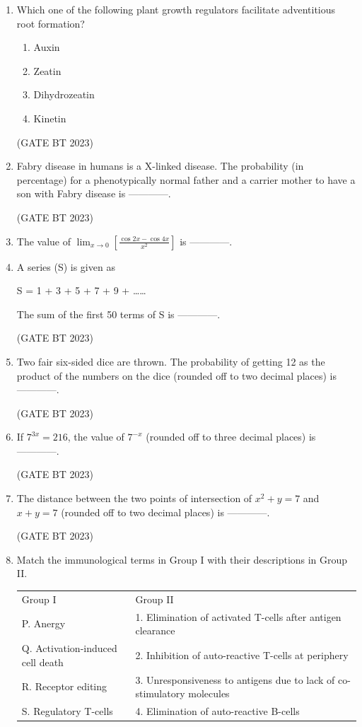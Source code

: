 \documentclass[journal,12pt,onecolumn]{IEEEtran}
\begin{document}
\begin{enumerate}
    \item Which one of the following plant growth regulators facilitate adventitious root formation?
    \begin{enumerate}
        \item Auxin
        \item Zeatin
        \item Dihydrozeatin
        \item Kinetin
    \end{enumerate}
    \hfill(GATE BT 2023)

    \item Fabry disease in humans is a X-linked disease. The probability (in percentage) for a phenotypically normal father and a carrier mother to have a son with Fabry disease is ------------.

\hfill(GATE BT 2023)

    \item The value of $\lim_{x \to 0} \left[ \frac{\cos 2x - \cos 4x}{x^2} \right]$ is ------------.

    \item A series (S) is given as
    
    S = 1 + 3 + 5 + 7 + 9 + ……
    
    The sum of the first 50 terms of S is ------------.

    \hfill(GATE BT 2023)

    \item Two fair six-sided dice are thrown. The probability of getting 12 as the product of the numbers on the dice (rounded off to two decimal places) is ------------.

    \hfill(GATE BT 2023)

    \item If $7^{3x} = 216$, the value of $7^{-x}$ (rounded off to three decimal places) is ------------.

    \hfill(GATE BT 2023)

    \item The distance between the two points of intersection of $x^2 + y = 7$ and $x + y = 7$ (rounded off to two decimal places) is ------------.

    \hfill(GATE BT 2023)

    \item Match the immunological terms in Group I with their descriptions in Group II.
    
    \begin{tabular}{ll}
        Group I & Group II \\
        P. Anergy & 1. Elimination of activated T-cells after antigen clearance \\
        Q. Activation-induced cell death & 2. Inhibition of auto-reactive T-cells at periphery \\
        R. Receptor editing & 3. Unresponsiveness to antigens due to lack of co-stimulatory molecules \\
        S. Regulatory T-cells & 4. Elimination of auto-reactive B-cells \\
    \end{tabular}
    

\end{enumerate}
\end{document}
